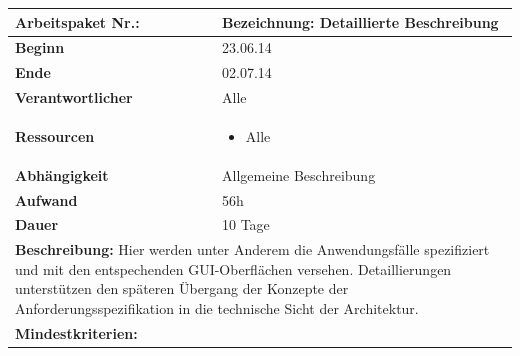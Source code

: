 \documentclass[fontsize=12pt,paper=a4,twoside]{scrartcl}
\begin{document}
	\begin{tabular}{|p{5.3cm}|p{9.7cm}|}\hline
		\textbf{Arbeitspaket Nr.:}  & \textbf{Bezeichnung:} Detaillierte Beschreibung\\ \hline \hline
		\textbf{Beginn} & 23.06.14\\ \hline
		\textbf{Ende} & 02.07.14\\ \hline
		\textbf{Verantwortlicher} & Alle\\ \hline
		\textbf{Ressourcen} & \begin{itemize}
			\item Alle
		\end{itemize}    \\ \hline
		\textbf{Abhängigkeit} & Allgemeine Beschreibung\\ \hline
		\textbf{Aufwand} & 56h\\ \hline
		\textbf{Dauer} & 10 Tage\\ \hline
		\multicolumn{2}{|p{15cm}|}{\textbf{Beschreibung:} Hier werden unter Anderem die Anwendungsfälle spezifiziert und mit den entspechenden GUI-Oberflächen versehen. 
			Detaillierungen unterstützen den späteren Übergang der Konzepte der Anforderungsspezifikation in die technische Sicht der Architektur.\newline  }\\ \hline
		\multicolumn{2}{|p{15cm}|}{\textbf{Mindestkriterien:}\newline  }\\ \hline
	\end{tabular}
	
	\begin{verbatim} 
	\end{verbatim}
	
\end{document}
